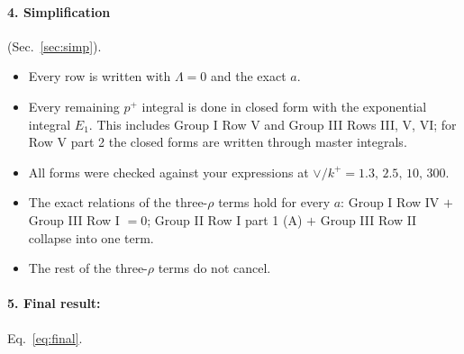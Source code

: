 \documentclass[10pt]{article}
\numberwithin{equation}{section}
\begin{document}
\paragraph{4. Simplification} (Sec.~\ref{sec:simp}).
\begin{itemize}
\item Every row is written with $\Lambda=0$ and the exact $a$.
\item Every remaining $p^+$ integral is done in closed form with the exponential integral $E_1$. This includes Group I Row V and Group III Rows III, V, VI; for Row V part 2 the closed forms are written through master integrals.
\item All forms were checked against your expressions at $\vee/k^+=1.3,\,2.5,\,10,\,300$.
\item The exact relations of the three-$\rho$ terms hold for every $a$: Group I Row IV $+$ Group III Row I $=0$; Group II Row I part 1 (A) $+$ Group III Row II collapse into one term.
\item The rest of the three-$\rho$ terms do not cancel.
\end{itemize}

\paragraph{5. Final result:} Eq.~\eqref{eq:final}.
\end{document}
